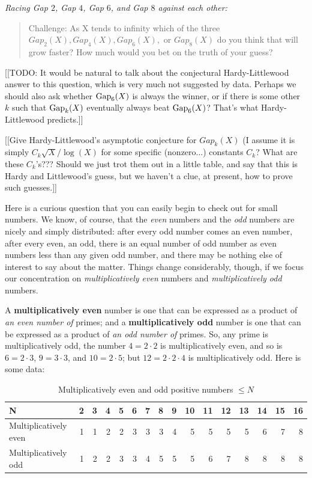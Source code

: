 \documentclass[11pt]{article}
\theoremstyle{plain}
\theoremstyle{definition}
\numberwithin{equation}{section}
\numberwithin{figure}{section}
\numberwithin{table}{section}
\begin{document}
{\em Racing Gap $2$,  Gap $4$, Gap $6$, and Gap $8$ against each other:} 
  
\begin{quote}
  Challenge: As X tends to infinity which of the three $Gap_2(X),
  Gap_4(X), Gap_6(X),$ or $Gap_8(X)$ do you think that will grow
  faster? How much would you bet on the truth of your guess?
\end{quote}
  
[[TODO: It would be natural to talk about the
conjectural Hardy-Littlewood answer to this question, which is very
much not suggested by data.  Perhaps we should also
ask whether ${\rm Gap}_6(X)$ is always the winner, or if there is some
other $k$ such that ${\rm Gap}_k(X)$ eventually always beat ${\rm
  Gap}_6(X)$?  That's what Hardy-Littlewood predicts.]]

[[Give Hardy-Littlewood's asymptotic conjecture for $Gap_k(X)$ (I
assume it is simply $C_k{\sqrt X}/\log(X)$ for some specific
(nonzero...)  constants $C_k$? What are these $C_k$'s???  Should we
just trot them out in a little table, and say that this is Hardy and
Littlewood's guess, but we haven't a clue, at present, how to prove
such guesses.]]


Here is a curious question that you can easily begin to check out for
small numbers. We know, of course, that the {\em even} numbers and the
{\em odd} numbers are nicely and simply distributed: after every odd
number comes an even number, after every even, an odd, there is an
equal number of odd number as even numbers less than any given odd
number, and there may be nothing else of interest to say about the
matter.  Things change considerably, though, if we focus our
concentration on {\em multiplicatively even} numbers and {\em
  multiplicatively odd} numbers.
  
  
A {\bf multiplicatively even} number is one that can be expressed as a
product of {\em an even number of} primes; and a {\bf multiplicatively
  odd} number is one that can be expressed as a product of {\em an odd
  number of} primes.  So, any prime is multiplicatively odd, the
number $4 = 2\cdot 2$ is multiplicatively even, and so is $6=2\cdot
3$, $9=3\cdot 3$, and $10= 2\cdot 5$; but $12=2\cdot 2\cdot 4$ is
multiplicatively odd.  Here is some data: \newpage
   
  \begin{table} \caption{Multiplicatively even and odd positive numbers $\le N$}
  \begin{center}
 
\begin{tabular}{|l|r|r|r|r|r|r|r|r|r|r|r|r|r|r|r|}
\hline
N & 2 & 3 & 4 & 5  & 6 & 7 & 8 & 9 & 10 & 11 & 12 & 13 & 14 & 15 & 16  \\ \hline
Multiplicatively even & 1 & 1 & 2 & 2  & 3 & 3 & 3 & 4 & 5 & 5 & 5 & 5 & 6 & 7 & 8 \\ \hline
Multiplicatively odd & 1 & 2 & 2 & 3  & 3 & 4 & 5 & 5 & 5 & 6 & 7 & 8 & 8 & 8 & 8 \\ \hline
\end{tabular}
\end{center}
\end{table}
\end{document}
